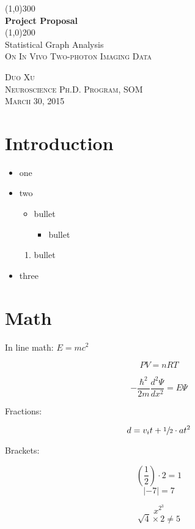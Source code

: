 \documentclass{article}
\begin{document}
\begin{titlepage}

	\begin{center}
		\line(1,0){300} \\
		[4mm]
		\huge{\bfseries Project Proposal} \\
		[1mm]
		\line(1,0){200} \\
		[1cm]
		\textsc{\LARGE } Statistical Graph Analysis\\
		[0.5cm]
		\textsc{\Large On In Vivo Two-photon Imaging Data} \\
		[9cm]
	\end{center}
	\begin{flushright}
		\textsc
		{\large Duo Xu \\
		Neuroscience Ph.D. Program, SOM \\
		March 30, 2015 \\}
	\end{flushright}

\end{titlepage}


\section{Introduction}\label{sec:intro}
\lipsum[1]

\begin{itemize}
	\item one
	\item two
	\begin{itemize}
		\item bullet
		\begin{itemize}
			\item bullet
		\end{itemize}
	\end{itemize}
	\begin{enumerate}
		\item bullet
	\end{enumerate}
	\item three
\end{itemize}


\section{Math}\label{sec:math}

In line math: $E=mc^2$

$$PV=nRT$$

$$-\frac{\hbar^2}{2m}\frac{d^2\Psi}{dx^2}=E\Psi$$

Fractions:

$$d=v_it+\sfrac{1}{2} \cdot at^2$$

Brackets:

$$\left( \frac{1}{2} \right) \cdot 2 = 1$$
$$\left| -7 \right| = 7$$

$$x^{2^3}$$
$$\sqrt{4} \times 2 \neq 5$$
\end{document}
